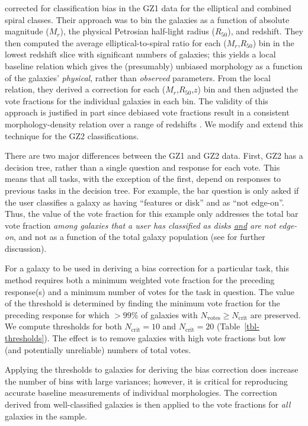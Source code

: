 \documentclass[useAMS,usenatbib]{mn2e}
\newcommand{\mr}{$M_r$}
\newcommand{\rfifty}{$R_{50}$}
\begin{document}
\citet{bam09} corrected for classification bias in the GZ1 data for the elliptical and combined spiral classes. Their approach was to bin the galaxies as a function of absolute magnitude (\mr), the physical Petrosian half-light radius (\rfifty), and redshift. They then computed the average elliptical-to-spiral ratio for each (\mr,\rfifty) bin in the lowest redshift slice with significant numbers of galaxies; this yields a local baseline relation which gives the (presumably) unbiased morphology as a function of the galaxies' {\em physical}, rather than {\em observed} parameters. From the local relation, they derived a correction for each (\mr,\rfifty,$z$) bin and then adjusted the vote fractions for the individual galaxies in each bin. The validity of this approach is justified in part since debiased vote fractions result in a consistent morphology-density relation over a range of redshifts \citep{bam09}. We modify and extend this technique for the GZ2 classifications. 

There are two major differences between the GZ1 and GZ2 data. First, GZ2 has a decision tree, rather than a single question and response for each vote. This means that all tasks, with the exception of the first, depend on responses to previous tasks in the decision tree. For example, the bar question is only asked if the user classifies a galaxy as having ``features or disk'' and as ``not edge-on''. Thus, the value of the vote fraction for this example only addresses the total bar vote fraction {\em among galaxies that a user has classified as disks \underline{and} are not edge-on}, and not as a function of the total galaxy population (see \citealt{cas13} for further discussion). 

For a galaxy to be used in deriving a bias correction for a particular task, this method requires both a minimum weighted vote fraction for the preceding response(s) and a minimum number of votes for the task in question. The value of the threshold is determined by finding the minimum vote fraction for the preceding response for which $>99\%$ of galaxies with $N_\mathrm{votes}\geq N_\mathrm{crit}$ are preserved. We compute thresholds for both $N_\mathrm{crit}=10$ and $N_\mathrm{crit}=20$ (Table~\ref{tbl-thresholds}). The effect is to remove galaxies with high vote fractions but low (and potentially unreliable) numbers of total votes. 

Applying the thresholds to galaxies for deriving the bias correction does increase the number of bins with large variances; however, it is critical for reproducing accurate baseline measurements of individual morphologies. The correction derived from well-classified galaxies is then applied to the vote fractions for {\em all} galaxies in the sample. 
\end{document}
